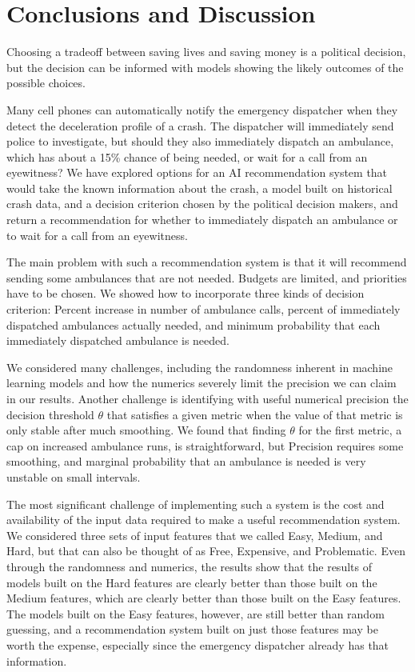 \section{Conclusions and Discussion}
\label{conclusions}

Choosing a tradeoff between saving lives and saving money is a political decision, but the decision can be informed with models showing the likely outcomes of the possible choices.  

Many cell phones can automatically notify the emergency dispatcher when they detect the deceleration profile of a crash.  The dispatcher will immediately send police to investigate, but should they also immediately dispatch an ambulance, which has about a 15\% chance of being needed, or wait for a call from an eyewitness?  We have explored options for an AI recommendation system that would take the known information about the crash, a model built on historical crash data, and a decision criterion chosen by the political decision makers, and return a recommendation for whether to immediately dispatch an ambulance or to wait for a call from an eyewitness.

The main problem with such a recommendation system is that it will recommend sending some ambulances that are not needed.  Budgets are limited, and priorities have to be chosen.  We showed how to incorporate three kinds of decision criterion:  Percent increase in number of ambulance calls, percent of immediately dispatched ambulances actually needed, and minimum probability that each immediately dispatched ambulance is needed.  

We considered many challenges, including the randomness inherent in machine learning models and how the numerics severely limit the precision we can claim in our results.  Another challenge is identifying with useful numerical precision the decision threshold $\theta$ that satisfies a given metric when the value of that metric is only stable after much smoothing.  We found that finding $\theta$ for the first metric, a cap on increased ambulance runs, is straightforward, but Precision requires some smoothing, and marginal probability that an ambulance is needed is very unstable on small intervals.

The most significant challenge of implementing such a system is the cost and availability of the input data required to make a useful recommendation system.  We considered three sets of input features that we called Easy, Medium, and Hard, but that can also be thought of as Free, Expensive, and Problematic.  Even through the randomness and numerics, the results show that the results of models built on the Hard features are clearly better than those built on the Medium features, which are clearly better than those built on the Easy features.  The models built on the Easy features, however, are still better than random guessing, and a recommendation system built on just those features may be worth the expense, especially since the emergency dispatcher already has that information.  




